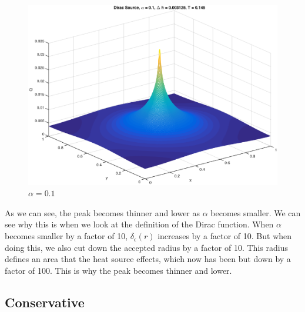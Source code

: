 \begin{figure}[!htb]
\centering
\includegraphics[scale=.6]{4_2_a_2.eps}
\caption{$\alpha = 0.1$}
\label{fig:digraph}
\end{figure}

As we can see, the peak becomes thinner and lower as $\alpha$ becomes smaller. We can see why this is when we look at the definition of the Dirac function. When $\alpha$ becomes smaller by a factor of 10, $\delta_{\epsilon}(r)$ increases by a factor of 10. But when doing this, we also cut down the accepted radius by a factor of 10. This radius defines an area that the heat source effects, which now has been but down by a factor of 100. This is why the peak becomes thinner and lower.

\subsection{Conservative}